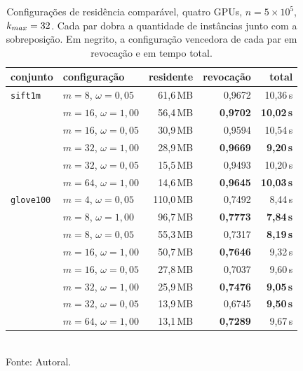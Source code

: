 \begin{table}[htb!]
\caption{\label{tab:overlap} Configurações de residência comparável, quatro \ac{GPU}s, $n = 5 \times 10^5$, $k_{max} = 32$. Cada par dobra a quantidade de instâncias junto com a sobreposição. Em negrito, a configuração vencedora de cada par em revocação e em tempo total.}
\centering
\footnotesize
\begin{tabular}{@{}llrrr@{}}
\toprule
conjunto & configuração & residente & revocação & total \\
\midrule
\texttt{sift1m}
  & $m = 8$, $\omega = 0{,}05$  & 61,6\,MB  & 0,9672 & 10,36\,s \\
  & $m = 16$, $\omega = 1{,}00$ & 56,4\,MB  & \textbf{0,9702} & \textbf{10,02\,s} \\
\addlinespace[1pt]
  & $m = 16$, $\omega = 0{,}05$ & 30,9\,MB  & 0,9594 & 10,54\,s \\
  & $m = 32$, $\omega = 1{,}00$ & 28,9\,MB  & \textbf{0,9669} & \textbf{9,20\,s} \\
\addlinespace[1pt]
  & $m = 32$, $\omega = 0{,}05$ & 15,5\,MB  & 0,9493 & 10,20\,s \\
  & $m = 64$, $\omega = 1{,}00$ & 14,6\,MB  & \textbf{0,9645} & \textbf{10,03\,s} \\
\midrule
\texttt{glove100}
  & $m = 4$, $\omega = 0{,}05$  & 110,0\,MB & 0,7492 & 8,44\,s \\
  & $m = 8$, $\omega = 1{,}00$  & 96,7\,MB  & \textbf{0,7773} & \textbf{7,84\,s} \\
\addlinespace[1pt]
  & $m = 8$, $\omega = 0{,}05$  & 55,3\,MB  & 0,7317 & \textbf{8,19\,s} \\
  & $m = 16$, $\omega = 1{,}00$ & 50,7\,MB  & \textbf{0,7646} & 9,32\,s \\
\addlinespace[1pt]
  & $m = 16$, $\omega = 0{,}05$ & 27,8\,MB  & 0,7037 & 9,60\,s \\
  & $m = 32$, $\omega = 1{,}00$ & 25,9\,MB  & \textbf{0,7476} & \textbf{9,05\,s} \\
\addlinespace[1pt]
  & $m = 32$, $\omega = 0{,}05$ & 13,9\,MB  & 0,6745 & \textbf{9,50\,s} \\
  & $m = 64$, $\omega = 1{,}00$ & 13,1\,MB  & \textbf{0,7289} & 9,67\,s \\
\bottomrule
\end{tabular}\\
Fonte: Autoral.
\end{table}

